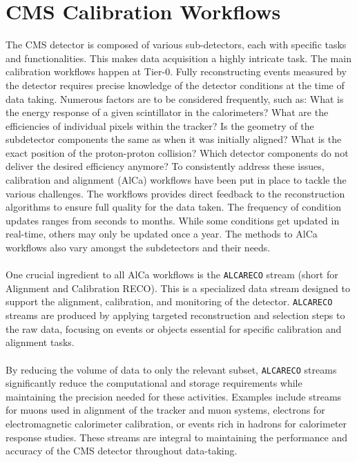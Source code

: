 \section{CMS Calibration Workflows}\label{sec:CMScalibration}
The CMS detector is composed of various sub-detectors, each with specific tasks and functionalities. This makes data acquisition a highly intricate task. The main calibration workflows happen at Tier-0. Fully reconstructing events measured by the detector requires precise knowledge of the detector conditions at the time of data taking. Numerous factors are to be considered frequently, such as: What is the energy response of a given scintillator in the calorimeters? What are the efficiencies of individual pixels within the tracker? Is the geometry of the subdetector components the same as when it was initially aligned?
What is the exact position of the proton-proton collision? Which detector components do not deliver the desired efficiency anymore? To consistently address these issues, calibration and alignment (AlCa) workflows have been put in place to tackle the various challenges. The workflows provides direct feedback to the reconstruction algorithms to ensure full quality for the data taken. The frequency of condition updates ranges from seconds to months. While some conditions get updated in real-time, others may only be updated once a year. The methods to AlCa workflows also vary amongst the subdetectors and their needs. \\ \\
One crucial ingredient to all AlCa workflows is the \texttt{ALCARECO} stream (short for Alignment and Calibration RECO).
This is a specialized data stream designed to support the alignment, calibration, and monitoring of the detector. \texttt{ALCARECO} streams are produced by applying targeted reconstruction and selection steps to the raw data, focusing on events or objects essential for specific calibration and alignment tasks.\\ \\
By reducing the volume of data to only the relevant subset, \texttt{ALCARECO} streams significantly reduce the computational and storage requirements while maintaining the precision needed for these activities. Examples include streams for muons used in alignment of the tracker and muon systems, electrons for electromagnetic calorimeter calibration, or events rich in hadrons for calorimeter response studies. These streams are integral to maintaining the performance and accuracy of the CMS detector throughout data-taking.\\ \\
